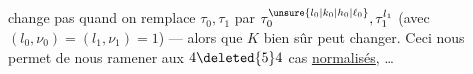 change pas quand on remplace $\tau_0,\tau_1$ par $\tau_0^{\unsure{l_0|k_0|h_0|\ell_0}},\tau_1^{l_1}$ (avec $(l_0,\nu_0)=(l_1,\nu_1)=1$) --- alors que $K$ bien sûr peut changer. Ceci nous permet de nous ramener aux $4\deleted{5}4$ cas \uline{normalisés},   \ldots

